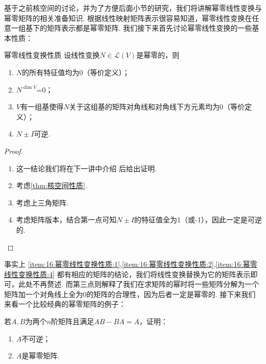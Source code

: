 基于之前核空间的讨论，并为了方便后面小节的研究，我们将讲解幂零线性变换与幂零矩阵的相关准备知识. 根据线性映射矩阵表示很容易知道，幂零线性变换在任意一组基下的矩阵表示都是幂零矩阵. 我们接下来首先讨论幂零线性变换的一些基本性质：
\begin{theorem}{}{幂零线性变换性质}
    设线性变换$N\in \mathcal{L}(V)$是幂零的，则
    \begin{enumerate}
        \item \label{item:16:幂零线性变换性质:1}
              $N$的所有特征值均为0（等价定义）；

        \item \label{item:16:幂零线性变换性质:2}
              $N^{\dim V}$=0；

        \item \label{item:16:幂零线性变换性质:3}
              $V$有一组基使得$N$关于这组基的矩阵对角线和对角线下方元素均为0（等价定义）；

        \item \label{item:16:幂零线性变换性质:4}
              $N\pm I$可逆.
    \end{enumerate}
\end{theorem}

\begin{proof}
    \begin{enumerate}
        \item 这一结论我们将在下一讲中介绍 后给出证明.

        \item 考虑\autoref{thm:核空间性质}.

        \item 考虑上三角矩阵.

        \item 考虑矩阵版本，结合第一点可知$N\pm I$的特征值全为1（或-1），因此一定是可逆的.
    \end{enumerate}
\end{proof}

事实上 \ref*{item:16:幂零线性变换性质:1},\ref*{item:16:幂零线性变换性质:2},\ref*{item:16:幂零线性变换性质:4} 都有相应的矩阵的结论，我们将线性变换替换为它的矩阵表示即可，此处不再赘述. 而第三点则解释了我们在求矩阵的幂时将一些矩阵分解为一个矩阵加一个对角线上全为0的矩阵的合理性，因为后者一定是幂零的. 接下来我们来看一个比较经典的幂零矩阵的例子：
\begin{example}{}{}
    若$A,B$为两个$n$阶矩阵且满足$AB-BA=A$，证明：
    \begin{enumerate}
        \item $A$不可逆；

        \item $A$是幂零矩阵.
    \end{enumerate}
\end{example}


